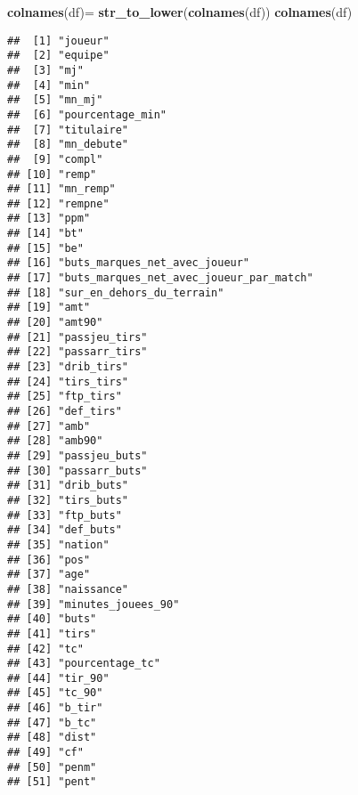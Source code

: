 \documentclass[7pt,]{report}
\newenvironment{Shaded}{\begin{snugshade}}{\end{snugshade}}
\newcommand{\KeywordTok}[1]{\textcolor[rgb]{0.13,0.29,0.53}{\textbf{#1}}}
\newcommand{\NormalTok}[1]{#1}
\newcommand{\StringTok}[1]{\textcolor[rgb]{0.31,0.60,0.02}{#1}}
\begin{document}
\begin{Shaded}
\begin{Highlighting}[]
\KeywordTok{colnames}\NormalTok{(df)=}\StringTok{ }\KeywordTok{str_to_lower}\NormalTok{(}\KeywordTok{colnames}\NormalTok{(df))}
\KeywordTok{colnames}\NormalTok{(df)}
\end{Highlighting}
\end{Shaded}

\begin{verbatim}
##  [1] "joueur"                                
##  [2] "equipe"                                
##  [3] "mj"                                    
##  [4] "min"                                   
##  [5] "mn_mj"                                 
##  [6] "pourcentage_min"                       
##  [7] "titulaire"                             
##  [8] "mn_debute"                             
##  [9] "compl"                                 
## [10] "remp"                                  
## [11] "mn_remp"                               
## [12] "rempne"                                
## [13] "ppm"                                   
## [14] "bt"                                    
## [15] "be"                                    
## [16] "buts_marques_net_avec_joueur"          
## [17] "buts_marques_net_avec_joueur_par_match"
## [18] "sur_en_dehors_du_terrain"              
## [19] "amt"                                   
## [20] "amt90"                                 
## [21] "passjeu_tirs"                          
## [22] "passarr_tirs"                          
## [23] "drib_tirs"                             
## [24] "tirs_tirs"                             
## [25] "ftp_tirs"                              
## [26] "def_tirs"                              
## [27] "amb"                                   
## [28] "amb90"                                 
## [29] "passjeu_buts"                          
## [30] "passarr_buts"                          
## [31] "drib_buts"                             
## [32] "tirs_buts"                             
## [33] "ftp_buts"                              
## [34] "def_buts"                              
## [35] "nation"                                
## [36] "pos"                                   
## [37] "age"                                   
## [38] "naissance"                             
## [39] "minutes_jouees_90"                     
## [40] "buts"                                  
## [41] "tirs"                                  
## [42] "tc"                                    
## [43] "pourcentage_tc"                        
## [44] "tir_90"                                
## [45] "tc_90"                                 
## [46] "b_tir"                                 
## [47] "b_tc"                                  
## [48] "dist"                                  
## [49] "cf"                                    
## [50] "penm"                                  
## [51] "pent"
\end{verbatim}
\end{document}
